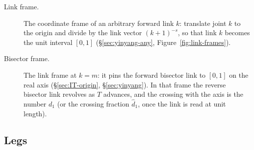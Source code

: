 \documentclass[11pt]{article}
\theoremstyle{definition}
\begin{document}
\begin{description}
\item[Link frame.]
The coordinate frame of an arbitrary forward link $k$: translate
joint $k$ to the origin and divide by the link vector $(k+1)^{-s}$,
so that link $k$ becomes the unit interval $[0,1]$
(\S\ref{sec:yinyang-any}, Figure~\ref{fig:link-frames}).

\item[Bisector frame.]
The link frame at $k=m$: it pins the forward bisector link to
$[0,1]$ on the real axis
(\S\ref{sec:IT-origin}, \S\ref{sec:yinyang}).
In that frame the reverse bisector link revolves as $T$ advances,
and the crossing with the axis is the number $d_1$
(or the crossing fraction $\hat d_1$, once the link is read at unit
length).
\end{description}

\subsection*{Legs}
\end{document}
